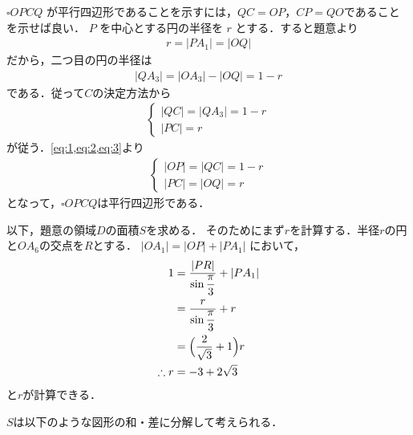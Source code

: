 \documentclass[../../main.tex]{subfiles}
\begin{document}
$\square OPCQ$ が平行四辺形であることを示すには，$QC = OP$，$CP = QO$であることを示せば良い．
$P$ を中心とする円の半径を $r$ とする．すると題意より
\begin{align}
  r = |PA_1| = |OQ| \label{eq:1}
\end{align}
だから，二つ目の円の半径は
\begin{align}
  |QA_3| = |OA_3| - |OQ| = 1 - r  \label{eq:2}
\end{align}
である．従って$C$の決定方法から
\begin{align}
  \begin{cases}
    |QC| = |QA_3| = 1-r \\
    |PC| = r
  \end{cases}\label{eq:3}
\end{align}
が従う．\cref{eq:1,eq:2,eq:3}より
\begin{align}
  \begin{cases}
    |OP| = |QC| = 1 - r \\
    |PC| = |OQ| = r
  \end{cases}
\end{align}
となって，$\square OPCQ$は平行四辺形である．

以下，題意の領域$D$の面積$S$を求める．
そのためにまず$r$を計算する．半径$r$の円と$OA_6$の交点を$R$とする．
$|OA_1| = |OP| + |PA_1|$ において，
\begin{align}
  1 &= \dfrac{|PR|}{\sin \dfrac{\pi}{3}} + |PA_1| \\
  &= \dfrac{r}{\sin \dfrac{\pi}{3}} +r \\
  &= \Bigl(\dfrac{2}{\sqrt{3}} + 1 \Bigr) r \\
  \therefore
  r &= -3 + 2\sqrt{3} \label{eq:4}
\end{align}
と$r$が計算できる．

$S$は以下のような図形の和・差に分解して考えられる．
\end{document}
